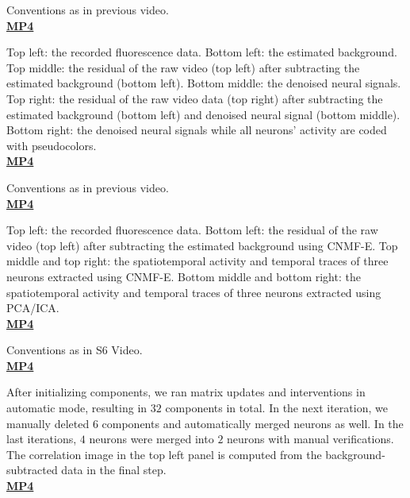 \documentclass[9pt,lineno]{elife}
\begin{document}
 Conventions as in previous video. \\
\href{http://www.columbia.edu/~pz2230/videos/sim_snr1_demixing.mp4}{\bf MP4}


 Top left: the recorded fluorescence data. Bottom left:  the estimated background. Top middle: the residual of the raw video (top left) after subtracting the estimated background (bottom left).  Bottom middle: the denoised neural signals. Top right: the residual of the raw video data (top right) after subtracting the estimated background (bottom left) and denoised neural signal (bottom middle). Bottom right: the denoised neural signals while all neurons' activity are coded with pseudocolors. \\
\href{http://www.columbia.edu/~pz2230/videos/striatum_demixing.mp4}{\bf MP4}


 Conventions as in previous video. \\
\href{http://www.columbia.edu/~pz2230/videos/pfc_demixing.mp4}{\bf MP4}


 Top left: the recorded fluorescence data. Bottom left: the residual of the raw video (top left) after subtracting the estimated background using CNMF-E. Top middle and top right: the spatiotemporal activity and temporal traces of three neurons extracted using CNMF-E. Bottom middle and bottom right:  the spatiotemporal activity and temporal traces of three neurons extracted using PCA/ICA. \\
\href{http://www.columbia.edu/~pz2230/videos/pfc_overlapping.mp4}{\bf MP4}


 Conventions as in S6 Video. \\
\href{http://www.columbia.edu/~pz2230/videos/sparse_demixing.mp4}{\bf MP4}

 After initializing components, we ran matrix updates and interventions in automatic mode, resulting in $32$ components in total. In the next iteration, we manually deleted $6$ components and automatically merged neurons as well. In the last iterations, $4$ neurons were merged into $2$ neurons with manual verifications. The correlation image in the top left panel is computed from the background-subtracted data in the final step.\\
\href{http://www.columbia.edu/~pz2230/videos/intervention_results.mp4}{\bf MP4}
\end{document}
